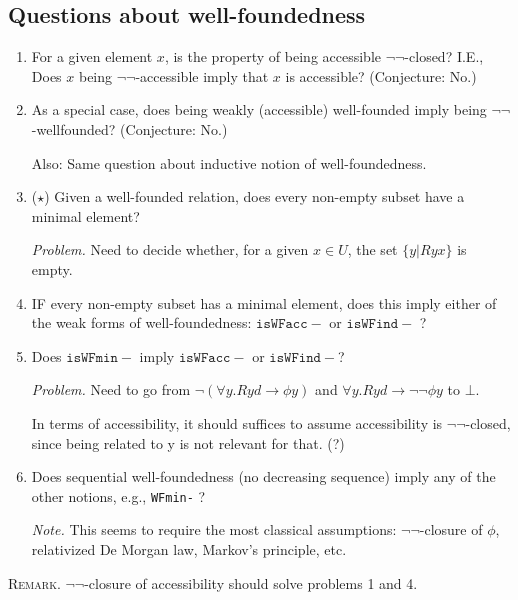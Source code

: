 \documentclass{scrartcl}
\begin{document}
\subsection{Questions about well-foundedness}

\begin{enumerate}
  \item For a given element $x$, is the property of
  being accessible $\lnot\lnot$-closed? I.E.,
  Does $x$ being $\lnot\lnot$-accessible imply that $x$ is accessible?
  (Conjecture: No.)

  \item As a special case, does being weakly (accessible) well-founded imply being $\lnot\lnot$-wellfounded?
  (Conjecture: No.)

  Also: Same question about inductive notion of well-foundedness.

  \item ($\star$) Given a well-founded relation, does every non-empty subset
  have a minimal element?

  \emph{Problem.} Need to decide whether, for a given $x \in U$,
   the set $\{y | Ryx\}$ is empty.

   \item IF every non-empty subset has a minimal element, does this imply
   either of the weak forms of well-foundedness: $\mathtt{isWFacc-}$ or
   $\mathtt{isWFind-}$ ?

   \item Does $\mathtt{isWFmin-}$ imply $\mathtt{isWFacc-}$ or $\mathtt{isWFind-}$?

   \emph{Problem.} Need to go from $\lnot (\forall y. R y d \to \phi y)$
   and $\forall y. R y d \to \lnot \lnot \phi y$ to $\bot$.
 
   In terms of accessibility, it should suffices to assume accessibility is
   $\lnot\lnot$-closed, since being related to y is not relevant for that. (?)

   \item Does sequential well-foundedness (no decreasing sequence) imply
   any of the other notions, e.g., \texttt{WFmin-} ?

   \emph{Note.}  This seems to require the most classical assumptions:
   $\lnot\lnot$-closure of $\phi$, relativized De Morgan law,
   Markov's principle, etc.
\end{enumerate}

\textsc{Remark.}
$\lnot\lnot$-closure of accessibility should solve problems 1 and 4.
\end{document}
